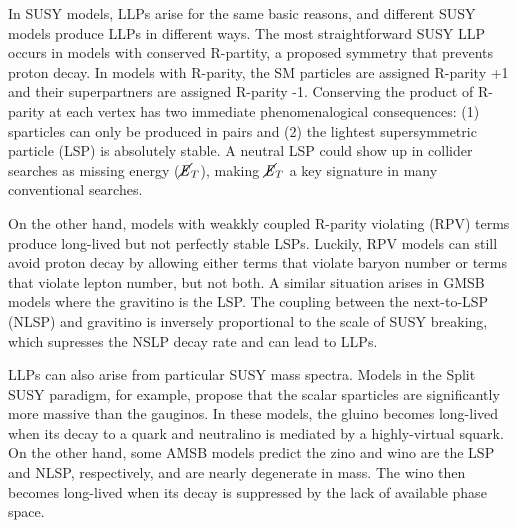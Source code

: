 \documentclass[12pt]{article}
\begin{document}
    In SUSY models, LLPs arise for the same basic reasons, and different SUSY models produce LLPs in different ways. The most straightforward SUSY LLP occurs in models with conserved R-partity, a proposed symmetry that prevents proton decay. In models with R-parity, the SM particles are assigned R-parity +1 and their superpartners are assigned R-parity -1. Conserving the product of R-parity at each vertex has two immediate phenomenalogical consequences: (1) sparticles can only be produced in pairs and (2) the lightest supersymmetric particle (LSP) is absolutely stable. A neutral LSP could show up in collider searches as missing energy ($\cancel{\it{E}}_{T}$), making $\cancel{\it{E}}_{T}$ a key signature in many conventional searches.


    On the other hand, models with weakkly coupled R-parity violating (RPV) terms produce long-lived but not perfectly stable LSPs. Luckily, RPV models can still avoid proton decay by allowing either terms that violate baryon number or terms that violate lepton number, but not both. A similar situation arises in GMSB models where the gravitino is the LSP. The coupling between the next-to-LSP (NLSP) and gravitino is inversely proportional to the scale of SUSY breaking, which supresses the NSLP decay rate and can lead to LLPs. 

    LLPs can also arise from particular SUSY mass spectra. Models in the Split  SUSY paradigm, for example, propose that the scalar sparticles are significantly more massive than the gauginos. In these models, the gluino becomes long-lived when its decay to a quark and neutralino is mediated by a highly-virtual squark.   On the other hand, some AMSB models predict the zino and wino are the LSP and NLSP, respectively, and are nearly degenerate in mass. The wino then becomes long-lived when its decay is suppressed by the lack of available phase space. 
\end{document}
